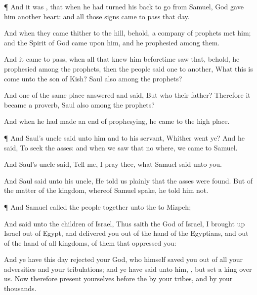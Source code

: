 {\par }{\PP {}¶ And it was
{}, that when he had
turned his
back to
go from
Samuel,
God
gave him
another
heart: and all those
signs
came to pass that
day.

And when they
came thither to the
hill, behold, a
company of
prophets
met him; and the
Spirit of
God
came upon him, and he
prophesied
among them.

And it came to pass, when all that
knew him
beforetime
saw that, behold, he
prophesied among the
prophets, then the
people
said
one to
another, What
{} this
{} is come unto the
son of
Kish?
{}
Saul also among the
prophets?

And
one of the same place
answered and
said, But who
{} their
father? Therefore it became a
proverb,
{}
Saul also among the
prophets?

And when he had made an
end of
prophesying, he
came to the high
place.


\par }{\PP {}¶ And
Saul’s
uncle
said unto him and to his
servant,
Whither
went ye? And he
said, To
seek the
asses: and when we
saw that
{} no
where, we
came to
Samuel.

And
Saul’s
uncle
said,
Tell me, I pray thee, what
Samuel
said unto you.

And
Saul
said unto his
uncle, He
told us
plainly that the
asses were
found. But of the
matter of the
kingdom, whereof
Samuel
spake, he
told him not.


\par }{\PP {}¶ And
Samuel
called the
people together unto the
{} to
Mizpeh;

And
said unto the
children of
Israel, Thus
saith the
{}
God of
Israel, I brought
up
Israel out of
Egypt, and
delivered you out of the
hand of the
Egyptians, and out of the
hand of all
kingdoms,
{} of them that
oppressed you:

And ye have this
day
rejected your
God, who himself
saved you out of all your
adversities and your
tribulations; and ye have
said unto him,
{}, but
set a
king over us. Now therefore
present yourselves
before the
{} by your
tribes, and by your
thousands.

}

